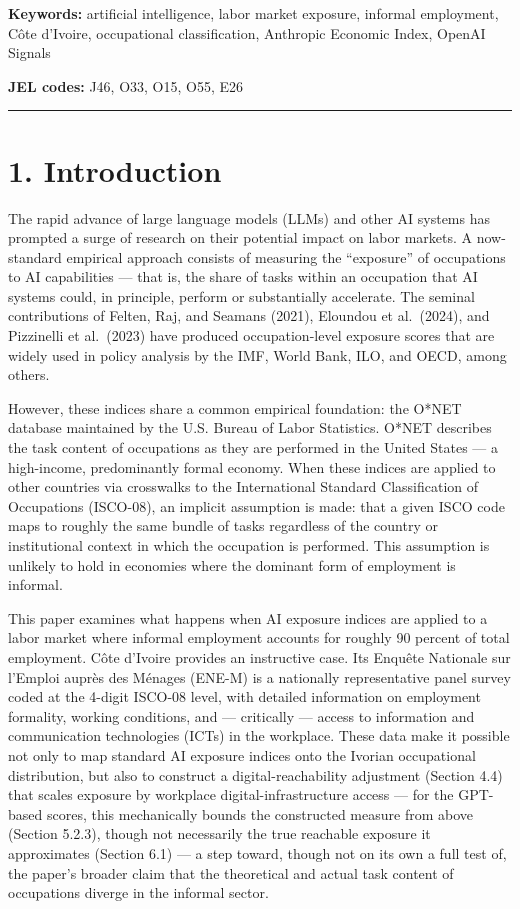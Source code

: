 \documentclass[
  11pt,
]{article}
\begin{document}
\textbf{Keywords:} artificial intelligence, labor market exposure,
informal employment, Côte d'Ivoire, occupational classification,
Anthropic Economic Index, OpenAI Signals

\textbf{JEL codes:} J46, O33, O15, O55, E26

\begin{center}\rule{0.5\linewidth}{0.5pt}\end{center}

\section{1. Introduction}\label{introduction}

The rapid advance of large language models (LLMs) and other AI systems
has prompted a surge of research on their potential impact on labor
markets. A now-standard empirical approach consists of measuring the
``exposure'' of occupations to AI capabilities --- that is, the share of
tasks within an occupation that AI systems could, in principle, perform
or substantially accelerate. The seminal contributions of Felten, Raj,
and Seamans (2021), Eloundou et al.~(2024), and Pizzinelli et al.~(2023)
have produced occupation-level exposure scores that are widely used in
policy analysis by the IMF, World Bank, ILO, and OECD, among others.

However, these indices share a common empirical foundation: the O*NET
database maintained by the U.S. Bureau of Labor Statistics. O*NET
describes the task content of occupations as they are performed in the
United States --- a high-income, predominantly formal economy. When
these indices are applied to other countries via crosswalks to the
International Standard Classification of Occupations (ISCO-08), an
implicit assumption is made: that a given ISCO code maps to roughly the
same bundle of tasks regardless of the country or institutional context
in which the occupation is performed. This assumption is unlikely to
hold in economies where the dominant form of employment is informal.

This paper examines what happens when AI exposure indices are applied to
a labor market where informal employment accounts for roughly 90 percent
of total employment. Côte d'Ivoire provides an instructive case. Its
Enquête Nationale sur l'Emploi auprès des Ménages (ENE-M) is a
nationally representative panel survey coded at the 4-digit ISCO-08
level, with detailed information on employment formality, working
conditions, and --- critically --- access to information and
communication technologies (ICTs) in the workplace. These data make it
possible not only to map standard AI exposure indices onto the Ivorian
occupational distribution, but also to construct a digital-reachability
adjustment (Section 4.4) that scales exposure by workplace
digital-infrastructure access --- for the GPT-based scores, this
mechanically bounds the constructed measure from above (Section 5.2.3),
though not necessarily the true reachable exposure it approximates
(Section 6.1) --- a step toward, though not on its own a full test of,
the paper's broader claim that the theoretical and actual task content
of occupations diverge in the informal sector.
\end{document}
